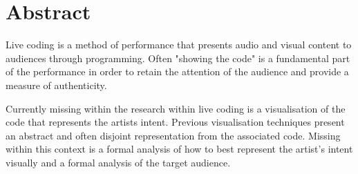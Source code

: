 
\chapter*{Abstract}
\label{cha:abstract}

Live coding is a method of performance that presents audio and visual content to audiences through programming. Often "showing the code" is a fundamental part of the performance in order to retain the attention of the audience and provide a measure of authenticity.




Currently missing within the research within live coding is a visualisation of the code that represents the artists intent. Previous visualisation techniques present an abstract and often disjoint representation from the associated code. Missing within this context is a formal analysis of how to best represent the artist's intent visually and a formal analysis of the target audience.

